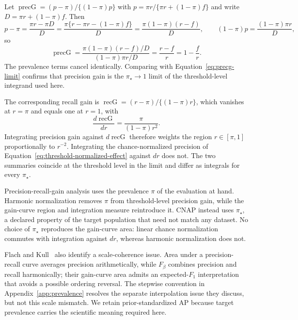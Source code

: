 \documentclass[11pt]{article}
\theoremstyle{remark}
\begin{document}
Let $\operatorname{precG}=(p-\pi)/\{(1-\pi)p\}$ with $p=\pi r/\{\pi r+(1-\pi)f\}$ and write $D=\pi r+(1-\pi)f$. Then
\[
p-\pi
=
\frac{\pi r-\pi D}{D}
=
\frac{\pi\{r-\pi r-(1-\pi)f\}}{D}
=
\frac{\pi(1-\pi)(r-f)}{D},
\qquad
(1-\pi)p
=
\frac{(1-\pi)\pi r}{D},
\]
so
\[
\operatorname{precG}
=
\frac{\pi(1-\pi)(r-f)/D}{(1-\pi)\pi r/D}
=
\frac{r-f}{r}
=
1-\frac{f}{r}.
\]
The prevalence terms cancel identically. Comparing with Equation~\eqref{eq:precg-limit} confirms that precision gain is the $\pi_\star\to1$ limit of the threshold-level integrand used here.

The corresponding recall gain is $\operatorname{recG}=(r-\pi)/\{(1-\pi)r\}$, which vanishes at $r=\pi$ and equals one at $r=1$, with
\[
\frac{d\operatorname{recG}}{dr}
=
\frac{\pi}{(1-\pi)r^{2}} .
\]
Integrating precision gain against $d\operatorname{recG}$ therefore weights the region $r\in[\pi,1]$ proportionally to $r^{-2}$. Integrating the chance-normalized precision of Equation~\eqref{eq:threshold-normalized-effect} against $dr$ does not. The two summaries coincide at the threshold level in the limit and differ as integrals for every $\pi_\star$.

Precision-recall-gain analysis uses the prevalence $\pi$ of the evaluation at hand. Harmonic normalization removes $\pi$ from threshold-level precision gain, while the gain-curve region and integration measure reintroduce it. CNAP instead uses $\pi_\star$, a declared property of the target population that need not match any dataset. No choice of $\pi_\star$ reproduces the gain-curve area: linear chance normalization commutes with integration against $dr$, whereas harmonic normalization does not.

Flach and Kull~\cite{flach2015prg} also identify a scale-coherence issue. Area under a precision-recall curve averages precision arithmetically, while $F_\beta$ combines precision and recall harmonically; their gain-curve area admits an expected-$F_1$ interpretation that avoids a possible ordering reversal. The stepwise convention in Appendix~\ref{app:prevalence} resolves the separate interpolation issue they discuss, but not this scale mismatch. We retain prior-standardized AP because target prevalence carries the scientific meaning required here.
\end{document}
